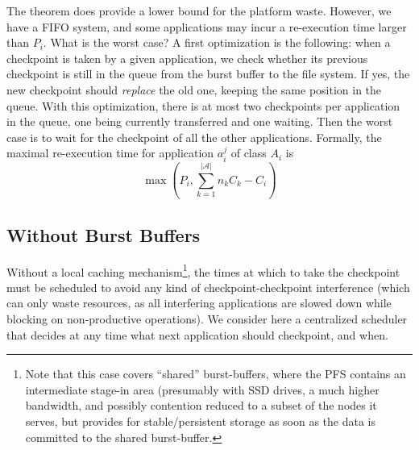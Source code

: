 \documentclass[conference]{IEEEtran}
\newcommand{\nbapps}{|{\mathcal A}|}
\newcommand{\app}[1]{A_{#1}}
\newcommand{\application}[2]{a_{#1}^{#2}}
\begin{document}
The theorem does provide a lower bound for the platform waste.
However, we have a FIFO system, and some applications may incur
a re-execution time larger than $P_{i}$. What is the worst case?
A first optimization is the following: when a checkpoint is taken
    by a given application, we check whether its previous checkpoint is
    still in the queue from the burst buffer to the file system. If yes, the new
checkpoint should \emph{replace} the old one, keeping the same position in the queue.
With this optimization, there is at most two checkpoints per application in the queue,
one being currently transferred and one waiting.
Then the worst case is to wait for the checkpoint of all the other applications.
Formally, the maximal re-execution time for application
$\application{i}{j}$ of class
$\app{i}$ is
$$\max(P_{i}, \sum_{k=1}^{\nbapps} n_{k}C_{k} - C_{i})$$




\subsection{Without Burst Buffers}

Without a local caching mechanism\footnote{Note that this case covers ``shared'' burst-buffers, where the
PFS contains an intermediate stage-in area (presumably with SSD drives, a much higher bandwidth, and possibly contention reduced to a subset of the nodes it serves, but provides for stable/persistent storage as soon as the data is committed to the shared burst-buffer.}, the times at which to take the checkpoint
must be scheduled to avoid any kind of checkpoint-checkpoint
interference (which can only waste resources, as all interfering
applications are slowed down while blocking on non-productive
operations). We consider here a centralized scheduler that decides at
any time what next application should checkpoint, and when.
\end{document}
